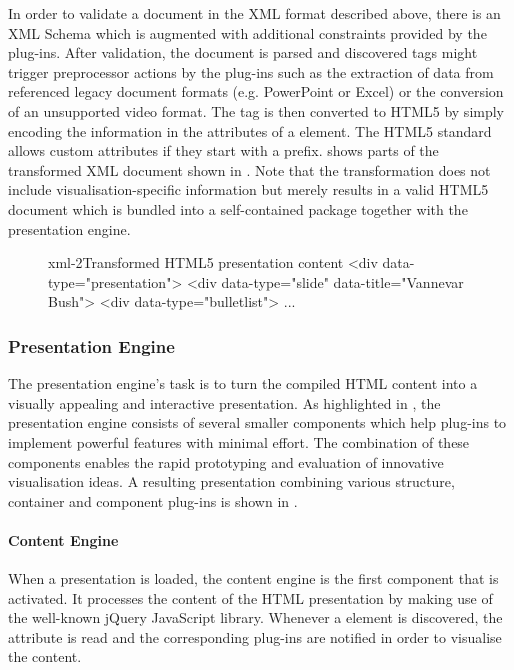      In order to validate a \mxp document in the XML format described above,
     there is an XML Schema which is augmented with additional constraints
     provided by the plug-ins. After validation, the document is parsed and
     discovered tags might trigger preprocessor actions by the plug-ins such as
     the extraction of data from referenced legacy document formats (e.g.
     PowerPoint or Excel) or the conversion of an unsupported video format. The
     tag is then converted to HTML5 by simply encoding the information in the
     attributes of a  element. The HTML5 standard allows custom
     attributes if they start with a  prefix.  shows
     parts of the transformed XML document shown in . Note that
     the transformation does not include visualisation-specific information but
     merely results in a valid HTML5 document which is bundled into a
     self-contained package together with the presentation engine.

     \begin{figure}[h!]
      \begin{lstxml}{xml-2}{Transformed HTML5 presentation content}
<div data-type="presentation">
  <div data-type="slide" data-title="Vannevar Bush">
    <div data-type="bulletlist">
      ...
      \end{lstxml}
     \end{figure}

    \subsubsection{Presentation Engine}

     The presentation engine's task is to turn the compiled HTML content into a
     visually appealing and interactive presentation. As highlighted in
     , the presentation engine consists of several
     smaller components which help plug-ins to implement powerful features with
     minimal effort. The combination of these components enables the rapid
     prototyping and evaluation of innovative visualisation ideas. A resulting
     \mxp presentation combining various structure, container and component
     plug-ins is shown in .


     \paragraph{Content Engine} When a presentation is loaded, the content
      engine is the first component that is activated. It processes the content
      of the HTML presentation by making use of the well-known jQuery
      JavaScript library. Whenever a  element is discovered, the
       attribute is read and the corresponding plug-ins are
      notified in order to visualise the content.


